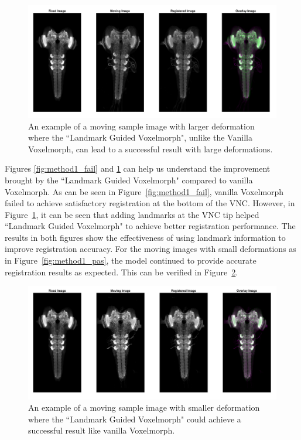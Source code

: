 \documentclass{book}
\begin{document}
	\begin{figure}[h!]
		\centering
		\includegraphics[width=0.9\columnwidth]{resources/chapter4/method2/np_60H12_14E09_MB049B_020113B_scaled.tif.png}
		\caption{An example of a moving sample image with larger deformation where the ``Landmark Guided Voxelmorph", unlike the Vanilla Voxelmorph, can lead to a successful result with large deformations.}
		\label{fig:method2_fail}
	\end{figure}
	
	Figures \ref{fig:method1_fail} and \ref{fig:method2_fail} can help us understand the improvement brought by the ``Landmark Guided Voxelmorph" compared to vanilla Voxelmorph. As can be seen in Figure~\ref{fig:method1_fail}, vanilla Voxelmorph failed to achieve satisfactory registration at the bottom of the VNC. However, in Figure~\ref{fig:method2_fail}, it can be seen that adding landmarks at the VNC tip helped ``Landmark Guided Voxelmorph" to achieve better registration performance. The results in both figures show the effectiveness of using landmark information to improve registration accuracy. For the moving images with small deformations as in Figure~\ref{fig:method1_pas}, the model continued to provide accurate registration results as expected. This can be verified in Figure~\ref{fig:method2_pas}.
	
	\begin{figure}[h!]
		\centering
		\includegraphics[width=0.9\columnwidth]{resources/chapter4/method2/np_brain7_scaled.tif.png}
		\caption{An example of a moving sample image with smaller deformation where the ``Landmark Guided Voxelmorph" could achieve a successful result like vanilla Voxelmorph.}
		\label{fig:method2_pas}
	\end{figure}
	
\end{document}
